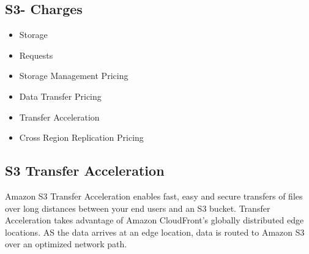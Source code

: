 \documentclass{article}
\begin{document}
	\subsection{S3- Charges}
	\begin{itemize}
	\item
	Storage
	
	\item
	Requests
	
	\item
	Storage Management Pricing
	
	\item
	Data Transfer Pricing
	
	\item
	Transfer Acceleration
	
	\item
	Cross Region Replication Pricing
	\end{itemize}
	
	\subsection{S3 Transfer Acceleration}
	Amazon S3 Transfer Acceleration enables fast, easy and secure transfers of files over long distances between your end users and an S3 bucket. Transfer Acceleration takes advantage of Amazon CloudFront's globally distributed edge locations. AS the data arrives at an edge location, data is routed to Amazon S3 over an optimized network path.
	
	
\end{document}
